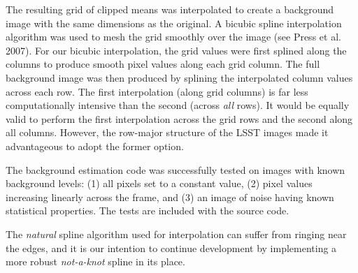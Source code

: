 The resulting grid of clipped means was interpolated to create a
background image with the same dimensions as the original.  A bicubic
spline interpolation algorithm was used to mesh the grid smoothly over
the image (see Press et al. 2007).  For our bicubic interpolation, the
grid values were first splined along the columns to produce smooth
pixel values along each grid column.  The full background image was
then produced by splining the interpolated column values across each
row.  The first interpolation (along grid columns) is far less
computationally intensive than the second (across {\itshape all}
rows).  It would be equally valid to perform the first interpolation
across the grid rows and the second along all columns.  However, the
row-major structure of the LSST images made it advantageous to adopt
the former option.


The background estimation code was successfully tested on images with
known background levels: (1) all pixels set to a constant value, (2)
pixel values increasing linearly across the frame, and (3) an image of
noise having known statistical properties.  The tests are included
with the source code.


The {\itshape natural} spline algorithm used for interpolation can
suffer from ringing near the edges, and it is our intention to
continue development by implementing a more robust {\itshape
not-a-knot} spline in its place.
